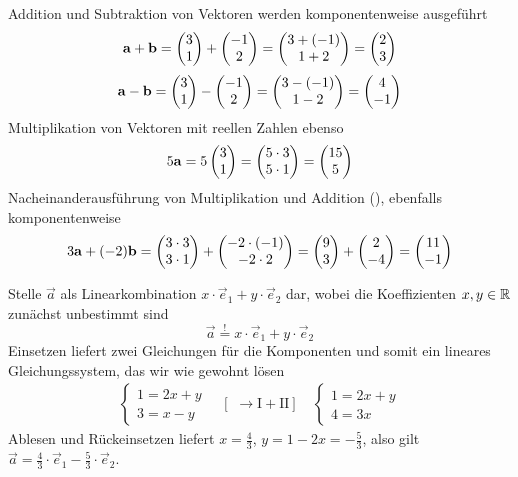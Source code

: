 \documentclass[11pt]{scrartcl}
\begin{document}
\begin{solution}
  \begin{subex}
  \item Addition und Subtraktion von Vektoren werden komponentenweise ausgeführt
  \[
    \mathbf{a} + \mathbf{b} = \begin{pmatrix} 3 \\ 1 \end{pmatrix} + \begin{pmatrix} -1 \\ 2 \end{pmatrix} = \begin{pmatrix} 3 + (-1) \\ 1 + 2 \end{pmatrix} = \begin{pmatrix} 2 \\ 3 \end{pmatrix}
  \]
  \[
    \mathbf{a} - \mathbf{b} = \begin{pmatrix} 3 \\ 1 \end{pmatrix} - \begin{pmatrix} -1 \\ 2 \end{pmatrix} = \begin{pmatrix} 3 - (-1) \\ 1 - 2 \end{pmatrix} = \begin{pmatrix} 4 \\ -1 \end{pmatrix}
  \]
  Multiplikation von Vektoren mit reellen Zahlen ebenso
  \[
    5 \mathbf{a} = 5 \begin{pmatrix} 3 \\ 1 \end{pmatrix} = \begin{pmatrix} 5 \cdot 3 \\ 5 \cdot 1 \end{pmatrix} = \begin{pmatrix} 15 \\ 5 \end{pmatrix}
  \]
  Nacheinanderausführung von Multiplikation und Addition (), ebenfalls komponentenweise
  \[
    3 \mathbf{a} + (-2) \mathbf{b} = \begin{pmatrix} 3 \cdot 3 \\ 3 \cdot 1 \end{pmatrix} + \begin{pmatrix} -2 \cdot (-1) \\ -2 \cdot 2 \end{pmatrix}
    = \begin{pmatrix} 9 \\ 3 \end{pmatrix} + \begin{pmatrix} 2 \\ -4 \end{pmatrix} = \begin{pmatrix} 11 \\ -1 \end{pmatrix}
  \]

  \item Stelle $\vec{a}$ als Linearkombination $x\cdot \vec{e}_1 + y\cdot \vec{e}_2$ dar, wobei die Koeffizienten $x,y \in \mathbb{R}$ zunächst unbestimmt sind
  \[
    \vec{a} \stackrel{!}{=} x \cdot \vec{e}_1 + y \cdot \vec{e}_2
  \]
  Einsetzen liefert zwei Gleichungen für die Komponenten und somit ein lineares Gleichungssystem, das wir wie gewohnt lösen
  \begin{align*}
    \left\{ \begin{array}{l}1 = 2x + y \\  3 = x - y \end{array} \right. \quad [\,\,\rightarrow \mathrm{I + II}] \quad \left\{ \begin{array}{l}1 = 2x + y  \\  4 = 3x \end{array} \right.
  \end{align*}
  Ablesen und Rückeinsetzen liefert $x = \frac{4}{3}$, $y = 1 - 2x = -\frac{5}{3}$, also gilt $\vec{a} = \frac{4}{3}\cdot\vec{e}_1 - \frac{5}{3}\cdot \vec{e}_2$.
  \end{subex}
\end{solution}
\end{document}
